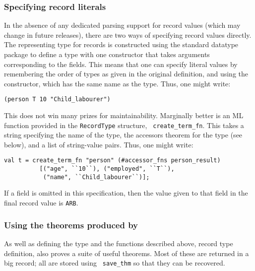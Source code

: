 \subsubsection{Specifying record literals}

In the absence of any dedicated parsing support for record values
(which may change in future releases), there are two ways of
specifying record values directly.  The representing type for records
is constructed using the standard datatype package to define a type
with one constructor that takes arguments corresponding to the fields.
This means that one can specify literal values by remembering the
order of types as given in the original definition, and using the
constructor, which has the same name as the type.  Thus, one might
write:
\begin{verbatim}
(person T 10 "Child_labourer")
\end{verbatim}
This does not win many prizes for maintainability.  Marginally better
is an ML function provided in the {\tt RecordType} structure, {\tt
  create\_term\_fn}.  This takes a string specifying the name of the
type, the accessors theorem for the type (see below), and a list of
string-value pairs.  Thus, one might write:
\begin{verbatim}
val t = create_term_fn "person" (#accessor_fns person_result)
          [("age", ``10``), ("employed", ``T``),
           ("name", ``Child_labourer``)];
\end{verbatim}
If a field is omitted in this specification, then the value given to
that field in the final record value is {\tt ARB}.

\subsubsection{Using the theorems produced by \createrec}

As well as defining the type and the functions described above, record
type definition, also proves a suite of useful theorems.  Most of
these are returned in a big record; all are stored using {\tt
  save\_thm} so that they can be recovered.

